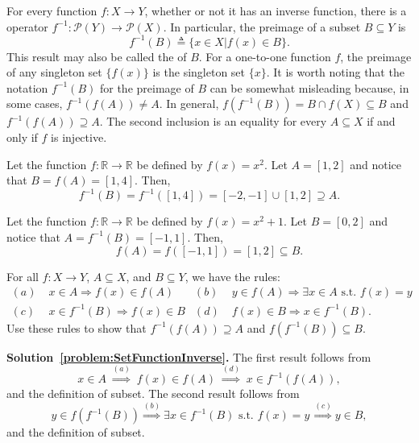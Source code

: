For every function $f:X\to Y$, whether or not it has an inverse function, there is a  operator $f^{-1}:\mathcal P(Y)\to\mathcal P(X)$.
In particular, the preimage of a subset $B\subseteq Y$ is
\[ f^{-1}(B) \triangleq \{ x\in X | f(x)\in B\}. \]
This result may also be called the  of $B$.
For a one-to-one function $f$, the preimage of any singleton set $\{ f(x) \}$ is the singleton set $\{ x \}$.
It is worth noting that the notation $f^{-1}(B)$ for the preimage of $B$ can be somewhat misleading because, in some cases, $f^{-1}(f(A)) \neq A$.
In general, $f(f^{-1}(B))=B\cap f(X)\subseteq B$ and $f^{-1}(f(A))\supseteq A$.
The second inclusion is an equality for every $A\subseteq X$ if and only if $f$ is injective.

\begin{example}
Let the function $f \colon \mathbb{R} \rightarrow \mathbb{R}$ be defined by $f(x)=x^2$. Let $A=[1,2]$ and notice that $B = f(A) = [1,4]$.  Then,
\[ f^{-1}(B) = f^{-1}([1,4]) = [-2,-1] \cup [1,2] \supseteq A. \]
\end{example}
\begin{example}
Let the function $f \colon \mathbb{R} \rightarrow \mathbb{R}$ be defined by $f(x)=x^2+1$. Let $B=[0,2]$ and notice that $A = f^{-1}(B) = [-1,1]$.  Then,
\[ f(A) = f([-1,1]) = [1,2] \subseteq B. \]
\end{example}

\begin{problem}
\label{problem:SetFunctionInverse}
For all $f:X\rightarrow Y$, $A\subseteq X$, and $B\subseteq Y$, we have the rules:
\begin{align*}
(a) & \; x \in A \Rightarrow f(x) \in f(A) &
(b) & \; y \in f(A) \Rightarrow \exists x\in A \textrm{ s.t. } f(x)=y \\
(c) & \; x\in f^{-1}(B) \Rightarrow f(x) \in B &
(d) & \; f(x) \in B \Rightarrow x\in f^{-1}(B) .
\end{align*}
Use these rules to show that $f^{-1}(f(A)) \supseteq A$ and $f(f^{-1}(B)) \subseteq B$.
\end{problem}
\noindent \textbf{Solution~\ref{problem:SetFunctionInverse}.}
The first result follows from
\[ x\in A \; \stackrel{(a)}{\Rightarrow} \; f(x)\in f(A) \; \stackrel{(d)}{\Rightarrow} \; x\in f^{-1}(f(A)), \]
and the definition of subset.
The second result follows from
\[ y\in f(f^{-1}(B)) \stackrel{(b)}{\Rightarrow} \exists x\in f^{-1}(B) \textrm{ s.t. } f(x)=y \, \stackrel{(c)}{\Rightarrow} y\in B, \]
and the definition of subset.

